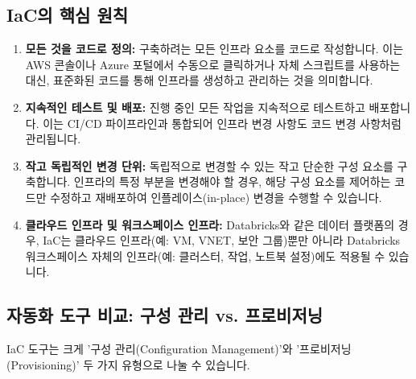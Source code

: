 \documentclass[11pt,a4paper]{article}
\theoremstyle{definition}
\begin{document}
\subsection{IaC의 핵심 원칙}
\begin{enumerate}
    \item \textbf{모든 것을 코드로 정의:}
    구축하려는 모든 인프라 요소를 코드로 작성합니다. 이는 AWS 콘솔이나 Azure 포털에서 수동으로 클릭하거나 자체 스크립트를 사용하는 대신, 표준화된 코드를 통해 인프라를 생성하고 관리하는 것을 의미합니다.

    \item \textbf{지속적인 테스트 및 배포:}
    진행 중인 모든 작업을 지속적으로 테스트하고 배포합니다. 이는 CI/CD 파이프라인과 통합되어 인프라 변경 사항도 코드 변경 사항처럼 관리됩니다.

    \item \textbf{작고 독립적인 변경 단위:}
    독립적으로 변경할 수 있는 작고 단순한 구성 요소를 구축합니다. 인프라의 특정 부분을 변경해야 할 경우, 해당 구성 요소를 제어하는 코드만 수정하고 재배포하여 인플레이스(in-place) 변경을 수행할 수 있습니다.

    \item \textbf{클라우드 인프라 및 워크스페이스 인프라:}
    Databricks와 같은 데이터 플랫폼의 경우, IaC는 클라우드 인프라(예: VM, VNET, 보안 그룹)뿐만 아니라 Databricks 워크스페이스 자체의 인프라(예: 클러스터, 작업, 노트북 설정)에도 적용될 수 있습니다.
\end{enumerate}

\subsection{자동화 도구 비교: 구성 관리 vs. 프로비저닝}
IaC 도구는 크게 '구성 관리(Configuration Management)'와 '프로비저닝(Provisioning)' 두 가지 유형으로 나눌 수 있습니다.
\end{document}
